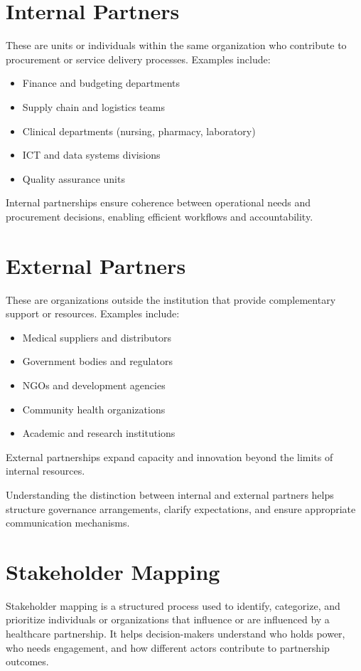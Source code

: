 \documentclass[10pt]{article}
\begin{document}
\section*{Internal Partners}
These are units or individuals within the same organization who contribute to procurement or service delivery processes. Examples include:

\begin{itemize}
  \item Finance and budgeting departments
  \item Supply chain and logistics teams
  \item Clinical departments (nursing, pharmacy, laboratory)
  \item ICT and data systems divisions
  \item Quality assurance units
\end{itemize}

Internal partnerships ensure coherence between operational needs and procurement decisions, enabling efficient workflows and accountability.

\section*{External Partners}
These are organizations outside the institution that provide complementary support or resources. Examples include:

\begin{itemize}
  \item Medical suppliers and distributors
  \item Government bodies and regulators
  \item NGOs and development agencies
  \item Community health organizations
  \item Academic and research institutions
\end{itemize}

External partnerships expand capacity and innovation beyond the limits of internal resources.

Understanding the distinction between internal and external partners helps structure governance arrangements, clarify expectations, and ensure appropriate communication mechanisms.

\section*{Stakeholder Mapping}
Stakeholder mapping is a structured process used to identify, categorize, and prioritize individuals or organizations that influence or are influenced by a healthcare partnership. It helps decision-makers understand who holds power, who needs engagement, and how different actors contribute to partnership outcomes.
\end{document}
